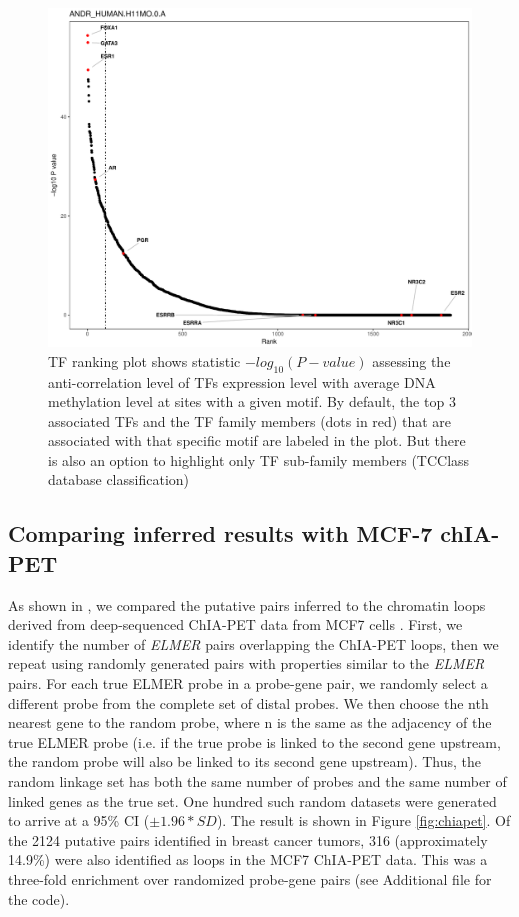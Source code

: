 \begin{figure}[ht!]
\centering
\includegraphics[width=1.0\textwidth]{images/ANDR_HUMAN_H11MO_0_A_TFrankPlot.pdf}
\caption{\label{fig:tfplot} TF ranking plot shows statistic $-log_{10}(P-value)$ assessing the anti-correlation level 
of TFs expression level with average DNA methylation level at sites with a given motif. By default, the top 3 associated TFs and the TF family members (dots in red) that are associated with that specific motif  are labeled in the plot.
But there is also an option to highlight only TF sub-family members (TCClass database classification)}
\end{figure}

\newpage


\subsection*{Comparing inferred results with MCF-7 chIA-PET}

As shown in , we compared the putative pairs inferred to the chromatin loops derived from deep-sequenced ChIA-PET data from MCF7 cells \cite{li2012extensive}. First, we identify the number of \textit{ELMER} pairs overlapping the ChIA-PET loops, then we repeat using randomly generated  pairs with properties similar to the \textit{ELMER} pairs. For each true ELMER probe in a probe-gene pair, we randomly select a different probe from the complete set of distal probes. We then choose the nth nearest gene to the random probe, where n is the same as the adjacency of the true ELMER probe (i.e. if the true probe is linked to the second gene upstream, the  random probe will also be linked to its second gene upstream). Thus, the random linkage set has both the same number of probes and the same number of linked genes as the true set. One hundred such random datasets were generated to arrive at a 95\% CI ($\pm 1.96* SD$).
The result is shown in Figure \ref{fig:chiapet}. Of the 2124 putative pairs identified in breast cancer tumors, 316 (approximately 14.9\%) were also identified as loops in the MCF7 ChIA-PET data. This was a three-fold enrichment over randomized probe-gene pairs (see Additional file for the code). 
 
